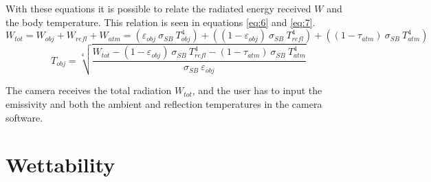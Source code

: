 \par With these equations it is possible to relate the radiated energy received $W$ and the body temperature. This relation is seen in equations \ref{eq:6} and \ref{eq:7}.
\begin{equation}\label{eq:6}
W_{tot}=W_{obj}+W_{refl}+W_{atm}=(\varepsilon_{obj} \ \sigma_{SB} \ T_{obj}^4)+((1-\varepsilon_{obj}) \ \sigma_{SB} \ T_{refl}^4)+((1-\tau_{atm}) \ \sigma_{SB} \ T_{atm}^4)
\end{equation}
\begin{equation}\label{eq:7}
T_{obj}=\sqrt[4]{\frac{W_{tot}-(1-\varepsilon_{obj}) \ \sigma_{SB} \ T_{refl}^4-(1-\tau_{atm}) \ \sigma_{SB} \ T_{atm}^4}{\sigma_{SB} \ \varepsilon_{obj}}}
\end{equation}
\par The camera receives the total radiation $W_{tot}$, and the user has to input the emissivity and both the ambient and reflection temperatures in the camera software.

\section{Wettability}

